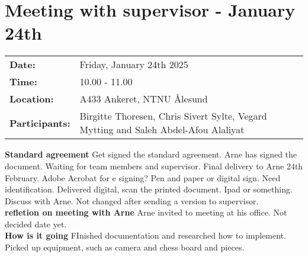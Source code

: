\section{Meeting with supervisor - January 24th}
\begin{tabular}{ll}
    \textbf{Date:} & Friday, January 24th 2025 \\
    \textbf{Time:} & 10.00 - 11.00\\
    \textbf{Location:} & A433 Ankeret, NTNU Ålesund \\
    \textbf{Participants:} & Birgitte Thoresen, Chris Sivert Sylte, Vegard Mytting and Saleh Abdel-Afou Alaliyat\\
\end{tabular}

\vspace{0.5cm}

\textbf{Standard agreement}
Get signed the standard agreement. Arne has signed the document. Waiting for team members and supervisor. Final delivery to Arne 24th February. Adobe Acrobat for e signing? Pen and paper or digital sign. Need identification. Delivered digital, scan the printed document. Ipad or something. Discuss with Arne. Not changed after sending a version to supervisor. \\

\textbf{refletion on meeting with Arne}
Arne invited to meeting at his office. Not decided date yet. \\

\textbf{How is it going}
FInished documentation and researched how to implement. Picked up equipment, such as camera and chess board and pieces. \\